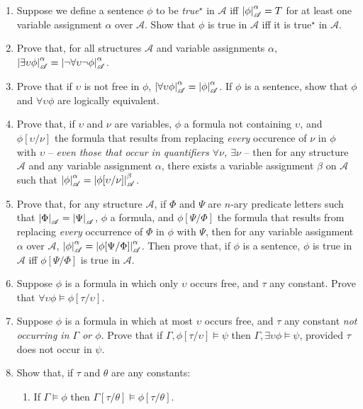 {\begin{enumerate}
	\item Suppose we define a sentence $\phi$ to be \emph{true}$^{\star}$ in $\mathscr{A}$ iff $\left|\phi\right|^{\alpha}_{\mathscr{A}}=T$ for at least one variable assignment $\alpha$ over $\mathscr{A}$. Show that $\phi$ is true in $\mathscr{A}$ iff it is  true$^{\star}$ in $\mathscr{A}$.
	\item Prove that, for all structures $\mathscr{A}$ and variable assignments $\alpha$, $\left|\exists\upsilon\phi\right|^{\alpha}_{\mathscr{A}}=\left|\neg\forall\upsilon\neg\phi\right|^{\alpha}_{\mathscr{A}}$.
	\item Prove that if $\upsilon$ is not free in $\phi$, $\left|\forall\upsilon\phi\right|^{\alpha}_{\mathscr{A}}=\left|\phi\right|^{\alpha}_{\mathscr{A}}$. If $\phi$ is a sentence, show that $\phi$ and $\forall\upsilon\phi$ are logically equivalent.
	\item Prove that, if $\upsilon$ and $\nu$ are variables,  $\phi$ a formula not containing $\upsilon$, and $\phi[\upsilon/\nu]$ the formula that results from replacing \emph{every} occurence of $\nu$ in $\phi$ with $\upsilon$ – \emph{even those that occur in quantifiers $\forall\nu$, $\exists\nu$} – then for any structure $\mathscr{A}$ and any variable assignment $\alpha$, there exists a variable assignment $\beta$ on $\mathscr{A}$ such that $\left|\phi\right|^{\alpha}_{\mathscr{A}}=\left|\phi[\upsilon/\nu]\right|^{ \beta}_{\mathscr{A}}$.
		\item Prove that, for any structure $\mathscr{A}$, if $\Phi$ and $\Psi$ are $n$-ary predicate letters such that $\left|\Phi\right|_{\mathscr{A}}=\left|\Psi\right|_{\mathscr{A}}$, $\phi$ a formula, and $\phi[\Psi/\Phi]$ the formula that results from replacing \emph{every} occurrence of $\Phi$ in $\phi$ with $\Psi$, then for any variable assignment $\alpha$ over $\mathscr{A}$, $\left|\phi\right|^{\alpha}_{\mathscr{A}}=\left|\phi[\Psi/\Phi]\right|^{\alpha}_{\mathscr{A}}$. Then prove that, if $\phi$ is a sentence, $\phi$ is true in $\mathscr{A}$ iff $\phi[\Psi/\Phi]$ is true in $\mathscr{A}$.
	\item	Suppose $\phi$ is a formula in which only $\upsilon$ occurs free, and $\tau$ any constant. Prove that $\forall\upsilon\phi \vDash \phi[\tau/\upsilon]$.
	\item Suppose $\phi$ is a formula in which at most $\upsilon$ occurs free, and $\tau$ any constant \emph{not occurring in $\Gamma$ or $\phi$}. Prove that
	if $\Gamma,\phi[\tau/\upsilon]\vDash \psi$ then
	 $\Gamma,\exists\upsilon\phi\vDash\psi$, provided $\tau$ does not occur in $\psi$.
\item Show that, if $\tau$ and $\theta$ are any constants: \begin{enumerate}
	\item If $\Gamma\vDash\phi$ then $\Gamma[\tau/\theta]\vDash \phi[\tau/\theta]$.

\end{enumerate}
\end{enumerate}}
